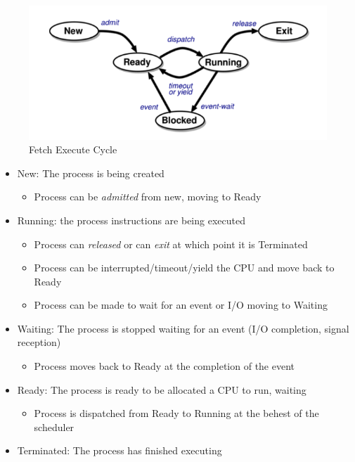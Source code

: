 \documentclass[]{article}
\begin{document}
        \begin{figure}[ht]
            \centering
            \includegraphics[width=0.5\linewidth]{"media/process"}
            \caption{Fetch Execute Cycle}
        \end{figure}

        \begin{itemize}
            \item New: The process is being created
                \begin{itemize}
                    \item Process can be \textit{admitted} from new, moving to Ready
                \end{itemize}
            \item Running: the process instructions are being executed
                \begin{itemize}
                    \item Process can \textit{released} or can \textit{exit} at which point it is Terminated
                    \item Process can be interrupted/timeout/yield the CPU and move back to Ready
                    \item Process can be made to wait for an event or I/O moving to Waiting
                \end{itemize}
            \item Waiting: The process is stopped waiting for an event (I/O completion, signal reception)
                \begin{itemize}
                    \item Process moves back to Ready at the completion of the event
                \end{itemize}
            \item Ready: The process is ready to be allocated a CPU to run, waiting
                \begin{itemize}
                    \item Process is dispatched from Ready to Running at the behest of the scheduler
                \end{itemize}
            \item Terminated: The process has finished executing

        \end{itemize}
\end{document}
